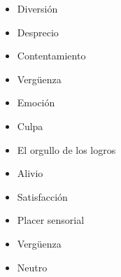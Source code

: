 \begin{itemize}
\item Diversión
\item Desprecio
\item Contentamiento
\item Vergüenza	
\item Emoción
\item Culpa
\item El orgullo de los logros
\item Alivio
\item Satisfacción
\item Placer sensorial
\item Vergüenza
\item Neutro
\end{itemize}
